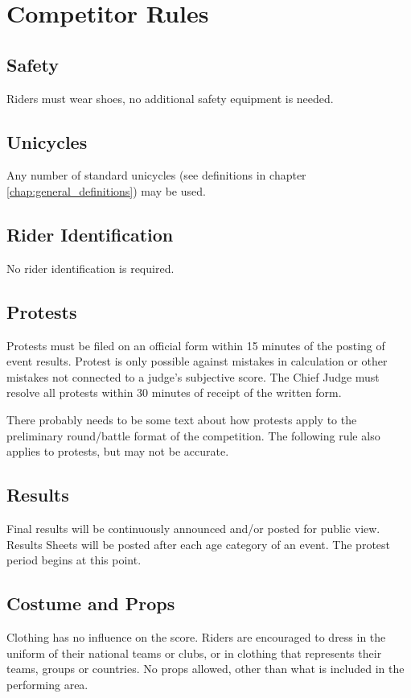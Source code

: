 \chapter{Competitor Rules}

\section{Safety}

Riders must wear shoes, no additional safety equipment is needed.

\section{Unicycles}

Any number of standard unicycles (see definitions in chapter \ref{chap:general_definitions}) may be used.

\section{Rider Identification}

No rider identification is required.

\section{Protests}

Protests must be filed on an official form within 15 minutes of the posting of event results.
Protest is only possible against mistakes in calculation or other mistakes not connected to a judge's subjective score.
The Chief Judge must resolve all protests within 30 minutes of receipt of the written form.

\begin{comment-2016}
There probably needs to be some text about how protests apply to the preliminary round/battle format of the competition.  The following rule also applies to protests, but may not be accurate.
\end{comment-2016}

\section{Results}
Final results will be continuously announced and/or posted for public view.
Results Sheets will be posted after each age category of an event.
The protest period begins at this point.

\section{Costume and Props}
Clothing has no influence on the score.
Riders are encouraged to dress in the uniform of their national teams or clubs, or in clothing that represents their teams, groups or countries.
No props allowed, other than what is included in the performing area.

